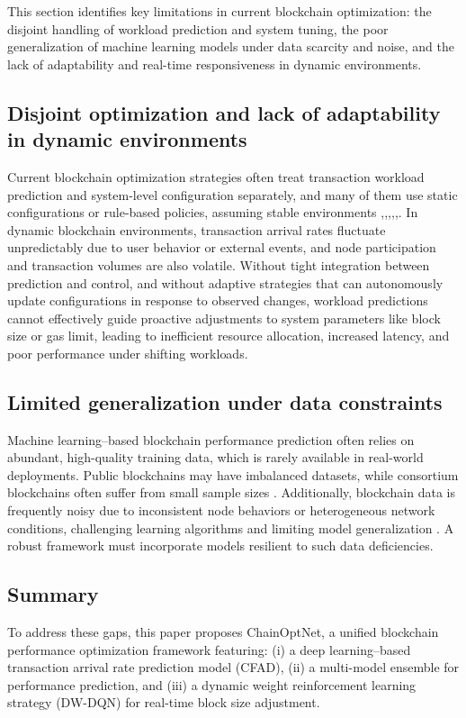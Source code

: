 \documentclass[a4paper,fleqn]{cas-dc}
\begin{document}
This section identifies key limitations in current blockchain optimization: the disjoint handling of workload prediction and system tuning, the poor generalization of machine learning models under data scarcity and noise, and the lack of adaptability and real-time responsiveness in dynamic environments.

\subsection{Disjoint optimization and lack of adaptability in dynamic environments}
\vspace{6pt}
Current blockchain optimization strategies often treat transaction workload prediction and system-level configuration separately, and many of them use static configurations or rule-based policies, assuming stable environments \citep{jamil2022improving},\citep{chen2022latency},\citep{wilhelmi2022end},\citep{wang2022bpr},\citep{wang2023learningchain},\citep{leng2019manuchain}. In dynamic blockchain environments, transaction arrival rates fluctuate unpredictably due to user behavior or external events, and node participation and transaction volumes are also volatile. Without tight integration between prediction and control, and without adaptive strategies that can autonomously update configurations in response to observed changes, workload predictions cannot effectively guide proactive adjustments to system parameters like block size or gas limit, leading to inefficient resource allocation, increased latency, and poor performance under shifting workloads.

\subsection{Limited generalization under data constraints}
\vspace{6pt}
Machine learning--based blockchain performance prediction often relies on abundant, high-quality training data, which is rarely available in real-world deployments. Public blockchains may have imbalanced datasets, while consortium blockchains often suffer from small sample sizes \citep{marsalek2019tackling}. Additionally, blockchain data is frequently noisy due to inconsistent node behaviors or heterogeneous network conditions, challenging learning algorithms and limiting model generalization \citep{xu2017information}. A robust framework must incorporate models resilient to such data deficiencies.


\subsection{Summary}
\vspace{6pt}
To address these gaps, this paper proposes ChainOptNet, a unified blockchain performance optimization framework featuring: (i) a deep learning--based transaction arrival rate prediction model (CFAD), (ii) a multi-model ensemble for performance prediction, and (iii) a dynamic weight reinforcement learning strategy (DW-DQN) for real-time block size adjustment. 
\end{document}
